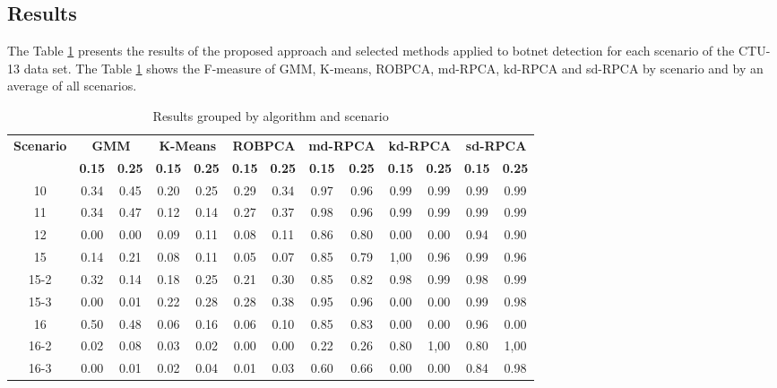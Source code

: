 \documentclass[review]{elsarticle}
\begin{document}
\subsection{Results}
\label{sec:results}

The Table \ref{tab:tab02} presents the results of the proposed approach and selected methods applied to botnet detection for each scenario of the CTU-13 data set. The Table \ref{tab:tab02} shows the F-measure of GMM, K-means, ROBPCA, md-RPCA, kd-RPCA and sd-RPCA by scenario and by an average of all scenarios.

\begin{table}[h!]
  \centering
  \scriptsize
  \caption{Results grouped by algorithm and scenario}
  \label{tab:tab02}
  \begin{tabular}{ c|c c|c c|c c|c c|c c|c c }
	\toprule
	\multirow{2}{*}{\textbf{Scenario}}   &\multicolumn{2}{c}{\textbf{GMM}} &\multicolumn{2}{c}{\textbf{K-Means}} &\multicolumn{2}{c}{\textbf{ROBPCA}} &\multicolumn{2}{c}{\textbf{md-RPCA}} &\multicolumn{2}{c}{\textbf{kd-RPCA}} &\multicolumn{2}{c}{\textbf{sd-RPCA}}\\ 
			\hhline{~------------}
			&\textbf{0.15} &\textbf{0.25} &\textbf{0.15} &\textbf{0.25} &\textbf{0.15} &\textbf{0.25} &\textbf{0.15} &\textbf{0.25} &\textbf{0.15} &\textbf{0.25} &\textbf{0.15} &\textbf{0.25}\\
	\midrule
		10 & 0.34 & 0.45 & 0.20 & 0.25 & 0.29 & 0.34 & 0.97 & 0.96 & 0.99 & 0.99 & 0.99 & 0.99 \\ \hline
		11 & 0.34 & 0.47 & 0.12 & 0.14 & 0.27 & 0.37 & 0.98 & 0.96 & 0.99 & 0.99 & 0.99 & 0.99 \\ \hline
		12 & 0.00 & 0.00 & 0.09 & 0.11 & 0.08 & 0.11 & 0.86 & 0.80 & 0.00 & 0.00 & 0.94 & 0.90 \\ \hline
		15 & 0.14 & 0.21 & 0.08 & 0.11 & 0.05 & 0.07 & 0.85 & 0.79 & 1,00 & 0.96 & 0.99 & 0.96 \\ \hline
		15-2 & 0.32 & 0.14 & 0.18 & 0.25 & 0.21 & 0.30 & 0.85 & 0.82 & 0.98 & 0.99 & 0.98 & 0.99 \\ \hline
		15-3 & 0.00 & 0.01 & 0.22 & 0.28 & 0.28 & 0.38 & 0.95 & 0.96 & 0.00 & 0.00 & 0.99 & 0.98 \\ \hline
		16 & 0.50 & 0.48 & 0.06 & 0.16 & 0.06 & 0.10 & 0.85 & 0.83 & 0.00 & 0.00 & 0.96 & 0.00 \\ \hline
		16-2 & 0.02 & 0.08 & 0.03 & 0.02 & 0.00 & 0.00 & 0.22 & 0.26 & 0.80 & 1,00 & 0.80 & 1,00 \\ \hline
		16-3 & 0.00 & 0.01 & 0.02 & 0.04 & 0.01 & 0.03 & 0.60 & 0.66 & 0.00 & 0.00 & 0.84 & 0.98 \\ \hline

\end{tabular}
\end{table}
\end{document}
